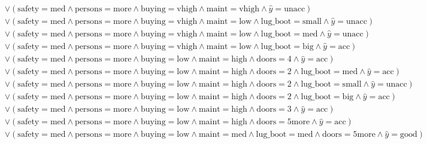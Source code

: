 \begin{scriptsize}
\[\begin{aligned}
  \\ & \lor (\text{safety}=\text{med} \land \text{persons}=\text{more} \land \text{buying}=\text{vhigh} \land \text{maint}=\text{vhigh} \land \hat{y}=\text{unacc})
  \\ & \lor (\text{safety}=\text{med} \land \text{persons}=\text{more} \land \text{buying}=\text{vhigh} \land \text{maint}=\text{low} \land \text{lug_boot}=\text{small} \land \hat{y}=\text{unacc})
  \\ & \lor (\text{safety}=\text{med} \land \text{persons}=\text{more} \land \text{buying}=\text{vhigh} \land \text{maint}=\text{low} \land \text{lug_boot}=\text{med} \land \hat{y}=\text{unacc})
  \\ & \lor (\text{safety}=\text{med} \land \text{persons}=\text{more} \land \text{buying}=\text{vhigh} \land \text{maint}=\text{low} \land \text{lug_boot}=\text{big} \land \hat{y}=\text{acc})
  \\ & \lor (\text{safety}=\text{med} \land \text{persons}=\text{more} \land \text{buying}=\text{low} \land \text{maint}=\text{high} \land \text{doors}=\text{4} \land \hat{y}=\text{acc})
  \\ & \lor (\text{safety}=\text{med} \land \text{persons}=\text{more} \land \text{buying}=\text{low} \land \text{maint}=\text{high} \land \text{doors}=\text{2} \land \text{lug_boot}=\text{med} \land \hat{y}=\text{acc})
  \\ & \lor (\text{safety}=\text{med} \land \text{persons}=\text{more} \land \text{buying}=\text{low} \land \text{maint}=\text{high} \land \text{doors}=\text{2} \land \text{lug_boot}=\text{small} \land \hat{y}=\text{unacc})
  \\ & \lor (\text{safety}=\text{med} \land \text{persons}=\text{more} \land \text{buying}=\text{low} \land \text{maint}=\text{high} \land \text{doors}=\text{2} \land \text{lug_boot}=\text{big} \land \hat{y}=\text{acc})
  \\ & \lor (\text{safety}=\text{med} \land \text{persons}=\text{more} \land \text{buying}=\text{low} \land \text{maint}=\text{high} \land \text{doors}=\text{3} \land \hat{y}=\text{acc})
  \\ & \lor (\text{safety}=\text{med} \land \text{persons}=\text{more} \land \text{buying}=\text{low} \land \text{maint}=\text{high} \land \text{doors}=\text{5more} \land \hat{y}=\text{acc})
  \\ & \lor (\text{safety}=\text{med} \land \text{persons}=\text{more} \land \text{buying}=\text{low} \land \text{maint}=\text{med} \land \text{lug_boot}=\text{med} \land \text{doors}=\text{5more} \land \hat{y}=\text{good})

\end{aligned}\]
\end{scriptsize}
